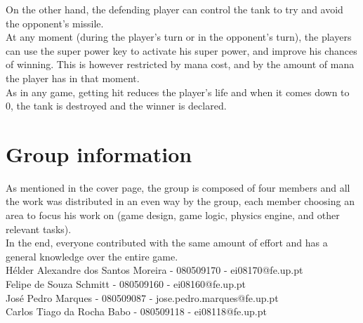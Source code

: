 \documentclass[11pt,a4paper]{report}
\begin{document}
On the other hand, the defending player can control the tank to try and avoid the opponent's missile. \\

At any moment (during the player's turn or in the opponent's turn), the players can use the super power key to activate his super power, and improve his chances of winning. This is however restricted by mana cost, and by the amount of mana the player has in that moment. \\

As in any game, getting hit reduces the player's life and when it comes down to 0, the tank is destroyed and the winner is declared.

\chapter{Group information}

As mentioned in the cover page, the group is composed of four members and all the work was distributed in an even way by the group, each member choosing an area to focus his work on (game design, game logic, physics engine, and other relevant tasks). \\

In the end, everyone contributed with the same amount of effort and has a general knowledge over the entire game. \\


H\'elder Alexandre dos Santos Moreira - 080509170 - ei08170@fe.up.pt \\

Felipe de Souza Schmitt - 080509160 - ei08160@fe.up.pt \\

Jos\'e Pedro Marques - 080509087 - jose.pedro.marques@fe.up.pt \\

Carlos Tiago da Rocha Babo - 080509118 - ei08118@fe.up.pt
\end{document}
